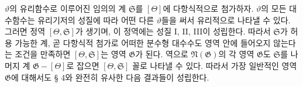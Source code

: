 
$\vartheta$의 유리함수로 이루어진 임의의 계 $\mathfrak S$를 $[\Theta]$에 다항식적으로 첨가하자. $\vartheta$의 모든 대수함수는 유리기저의 성질에 따라 어떤 다른 $\vartheta$들을 써서 유리적으로 나타낼 수 있다. 그러면 정역 $[\Theta,\mathfrak S]$가 생기며, 이 정역에는 성질 I, II, III이 성립한다. 따라서 $\mathfrak S$가 \glqq{}허용 가능한 계\grqq{}, 곧 다항식적 첨가로 어떠한 분수형 대수수도 영역 안에 들어오지 않는다는 조건을 만족하면 $[\Theta,\mathfrak S]$는 영역 $\mathfrak G$가 된다. 역으로 $\mathfrak N(\mathfrak G)$의 각 영역 $\mathfrak G$도 $\mathfrak S$를 나머지 계 $\mathfrak G-[\Theta]$로 잡으면 $[\Theta,\mathfrak S]$ 꼴로 나타낼 수 있다. 따라서 가장 일반적인 영역 $\mathfrak G$에 대해서도 § 4와 완전히 유사한 다음 결과들이 성립한다.
